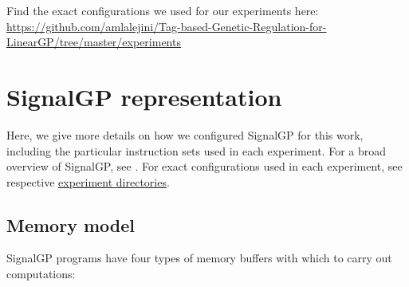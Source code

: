 \documentclass[
]{book}
\begin{document}
Find the exact configurations we used for our experiments here: \url{https://github.com/amlalejini/Tag-based-Genetic-Regulation-for-LinearGP/tree/master/experiments}

\hypertarget{signalgp-representation}{%
\chapter{SignalGP representation}\label{signalgp-representation}}

Here, we give more details on how we configured SignalGP for this work, including the particular instruction sets used in each experiment.
For a broad overview of SignalGP, see \citep{lalejini_evolving_2018}.
For exact configurations used in each experiment, see respective \href{https://github.com/amlalejini/Tag-based-Genetic-Regulation-for-LinearGP/tree/master/experiments}{experiment directories}.

\hypertarget{memory-model}{%
\section{Memory model}\label{memory-model}}

SignalGP programs have four types of memory buffers with which to carry out computations:
\end{document}
